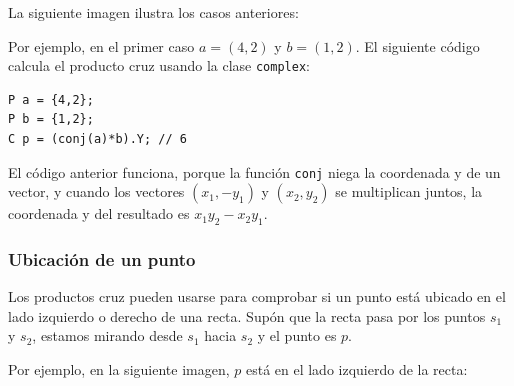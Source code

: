 La siguiente imagen ilustra los casos anteriores:
\begin{center}
\end{center}

\noindent
Por ejemplo, en el primer caso
$a=(4,2)$ y $b=(1,2)$.
El siguiente código calcula el producto cruz
usando la clase \texttt{complex}:

\begin{lstlisting}
P a = {4,2};
P b = {1,2};
C p = (conj(a)*b).Y; // 6
\end{lstlisting}

El código anterior funciona, porque
la función \texttt{conj} niega la coordenada y
de un vector,
y cuando los vectores $(x_1,-y_1)$ y $(x_2,y_2)$
se multiplican juntos, la coordenada y
del resultado es $x_1 y_2 - x_2 y_1$.

\subsubsection{Ubicación de un punto}

Los productos cruz pueden usarse para comprobar
si un punto está ubicado en el lado izquierdo o derecho
de una recta.
Supón que la recta pasa por los puntos
$s_1$ y $s_2$, estamos mirando desde $s_1$
hacia $s_2$ y el punto es $p$.

Por ejemplo, en la siguiente imagen,
$p$ está en el lado izquierdo de la recta:
\begin{center}
\end{center}

